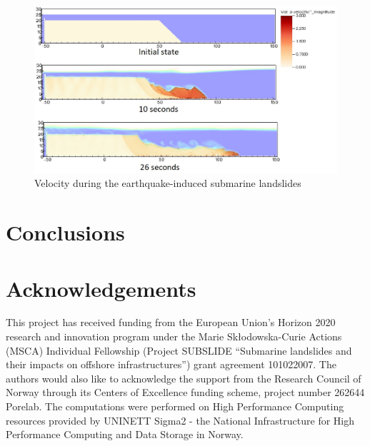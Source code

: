 \documentclass[preprint,12pt]{elsarticle}
\begin{document}
%
%
\begin{figure}[h]
\center
\includegraphics[scale=0.5]{landslide_vel.jpg}
\caption{Velocity during the earthquake-induced submarine landslides}
\label{fig:vel}
\end{figure}
%
%


\section{\textsf{Conclusions}}

\section{\textsf{Acknowledgements}}
This project has received funding from the European Union’s Horizon 2020 research and innovation program under the Marie Skłodowska-Curie Actions (MSCA) Individual Fellowship (Project SUBSLIDE “Submarine landslides and their impacts on offshore infrastructures”) grant agreement 101022007. The authors would also like to acknowledge the support from the Research Council of Norway through its Centers of Excellence funding scheme, project number 262644 Porelab. The computations were performed on High Performance Computing resources provided by UNINETT Sigma2 - the National Infrastructure for High Performance Computing and Data Storage in Norway.

\appendix
\end{document}
